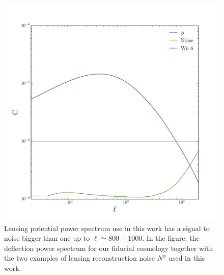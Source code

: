 \documentclass[aps,prd,reprint,superscriptaddress]{revtex4-1}
\begin{document}
\begin{figure}[htbp]
\begin{center}
\includegraphics[scale=0.4]{PS_phi_with_noise.pdf}
\caption{Lensing potential power spectrum use in this work has a signal to noise bigger than one up to $\ell\simeq800-1000$.
In the figure: the deflection power spectrum for our fiducial cosmology together with the two examples of lensing reconstruction noise $N^{\phi}$ used in this work.}
\label{fig:phi-cl-noise}
\end{center}
\end{figure}
\end{document}
